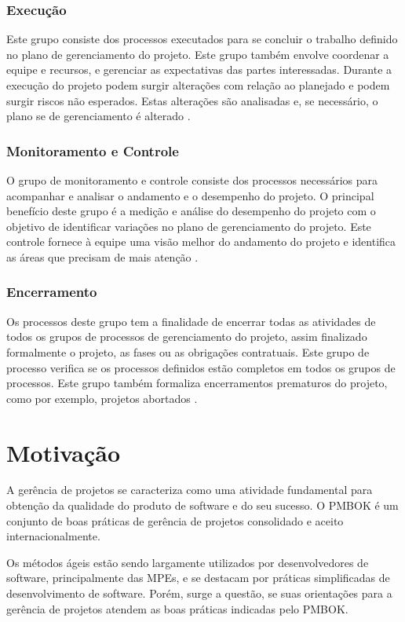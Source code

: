\documentclass[
    12pt,               %
    openright,          %
    twoside,            %
    a4paper,            %
    chapter=TITLE,     %
    english,            %
    spanish,            %
    portuguese              %
    ]{abntex2}
\begin{document}
\subsection{Execução}
Este grupo consiste dos processos executados para se concluir o trabalho definido no plano de gerenciamento do projeto. Este grupo também envolve coordenar a equipe e recursos, e gerenciar as expectativas das partes interessadas. Durante a execução do projeto podem surgir alterações com relação ao planejado e podem surgir riscos não esperados. Estas alterações são analisadas e, se necessário, o plano se de gerenciamento é alterado \cite[p.~55]{pmi2013}.

\subsection{Monitoramento e Controle}
O grupo de monitoramento e controle consiste dos processos necessários para acompanhar e analisar o andamento e o desempenho do projeto. O principal benefício deste grupo é a medição e análise do desempenho do projeto com o objetivo de identificar variações no plano de gerenciamento do projeto. Este controle fornece à equipe uma visão melhor do andamento do projeto e identifica as áreas que precisam de mais atenção \cite[p.~55]{pmi2013}.

\subsection{Encerramento}
Os processos deste grupo tem a finalidade de encerrar todas as atividades de todos os grupos de processos de gerenciamento do projeto, assim finalizado formalmente o projeto, as fases ou as obrigações contratuais. Este grupo de processo verifica se os processos definidos estão completos em todos os grupos de processos. Este grupo também formaliza encerramentos prematuros do projeto, como por exemplo, projetos abortados \cite[p.~55]{pmi2013}.




\chapter{Motivação}

A gerência de projetos se caracteriza como uma atividade fundamental para obtenção da qualidade do produto de software e do seu sucesso. O PMBOK é um conjunto de boas práticas de gerência de projetos consolidado e aceito internacionalmente.

Os métodos ágeis estão sendo largamente utilizados por desenvolvedores de software, principalmente das MPEs, e se destacam por práticas simplificadas de desenvolvimento de software. Porém, surge a questão, se suas orientações para a gerência de projetos atendem as boas práticas indicadas pelo PMBOK.
\end{document}
